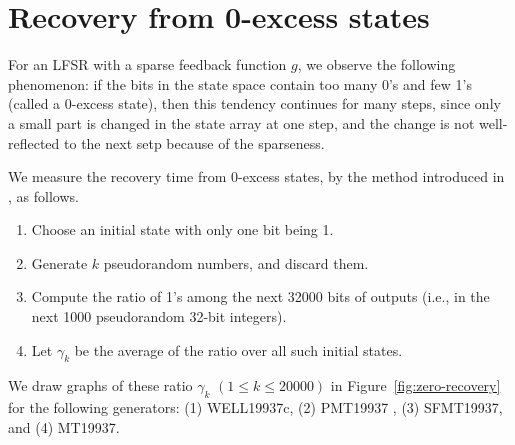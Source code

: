 \documentclass{svmult}
\begin{document}
\section{Recovery from 0-excess states}
For an LFSR with a sparse feedback function $g$,
we observe the following phenomenon: 
if the bits in the state space 
contain too many 0's and few 1's (called a 0-excess state), then
this tendency continues for many steps,
since only a small part is changed in the state array
at one step, and the change is not well-reflected to 
the next setp because of the sparseness.

We measure the recovery time from 0-excess states, 
by the method introduced in \cite{WELL}, as follows.
\begin{enumerate}
\item Choose an initial state with only one bit being 1.
\item Generate $k$ pseudorandom numbers, and discard them.
\item Compute the ratio of 1's among the 
next 32000 bits of outputs
(i.e., in the next 1000 pseudorandom 32-bit integers).
\item Let $\gamma_k$ be the average of the ratio over
all such initial states.
\end{enumerate}
We draw graphs of these ratio $\gamma_k$ $(1 \leq k \leq 20000)$
in Figure~\ref{fig:zero-recovery}
for the following generators: (1) WELL19937c, 
(2) PMT19937 \cite{PMT}, (3) SFMT19937, and (4) MT19937. 
\end{document}
